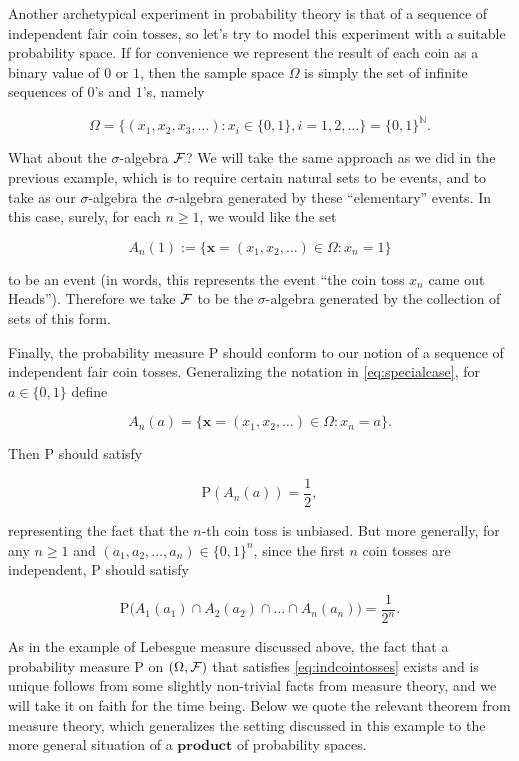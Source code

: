 \begin{example}
Another archetypical experiment in probability theory
is that of a sequence of independent fair coin tosses,
so let's try to model this experiment with a suitable
probability space. If for convenience we represent the
result of each coin as a binary value of $0$ or $1$,
then the sample space $\Omega$ is simply the set of
infinite sequences of $0$'s and $1$'s, namely

\[
\Omega = \big\{ (x_1, x_2, x_3, \ldots) : x_i \in \{0,1\}, i=1,2,\ldots \big\}
= \{ 0,1 \}^{\mathbb{N}}.
\]

\noindent What about the $\sigma$-algebra ${\cal F}$? We will
take the same approach as we did in the previous
example, which is to require certain natural sets to
be events, and to take as our $\sigma$-algebra the
$\sigma$-algebra generated by these ``elementary''
events. In this case, surely, for each $n\ge 1$, we
would like the set

\begin{equation*}
A_n(1) := \{ \mathbf{x}=(x_1,x_2,\ldots) \in \Omega : x_n = 1 \} \tag{2}\label{eq:specialcase}
\end{equation*}

\noindent to be an event (in words, this represents the event
``the coin toss $x_n$ came out Heads''). Therefore we
take ${\cal F}$ to be the $\sigma$-algebra generated
by the collection of sets of this form.

Finally, the probability measure $\mathrm{P}$ should
conform to our notion of a sequence of independent
fair coin tosses. Generalizing the notation in
\eqref{eq:specialcase}, for $a\in\{0,1\}$ define

\[
A_n(a) = \{ \mathbf{x}=(x_1,x_2,\ldots) \in \Omega : x_n = a \}.
\]

\noindent Then $\mathrm{P}$ should satisfy

\[
\mathrm{P}(A_n(a)) = \frac12,
\]

\noindent representing the fact that the $n$-th coin toss is
unbiased. But more generally, for any $n\ge 1$ and
$(a_1,a_2,\ldots,a_n) \in \{0,1\}^n$, since the first
$n$ coin tosses are independent, $\mathrm{P}$ should
satisfy

\begin{equation*} \tag{3}\label{eq:indcointosses}
\mathrm{P}\big(A_1(a_1) \cap A_2(a_2) \cap \ldots \cap A_n(a_n)\big) = \frac{1}{2^n}.
\end{equation*}

\noindent As in the example of Lebesgue measure discussed
above, the fact that a probability measure
$\mathrm{P}$  on $(\Omega, {\cal F})$ that satisfies
\eqref{eq:indcointosses} exists and is unique follows from
some slightly non-trivial facts from measure theory,
and we will take it on faith for the time being. Below
we quote the relevant theorem from measure theory,
which generalizes the setting discussed in this
example to the more general situation of a
$\textbf{product}$ of probability spaces.
\end{example}

